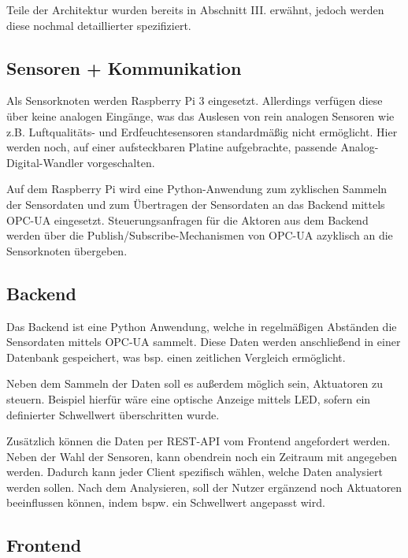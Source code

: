 \documentclass[letterpaper, 10 pt, conference]{ieeeconf}  %
\begin{document}
Teile der Architektur wurden bereits in Abschnitt III. erwähnt, jedoch werden diese nochmal detaillierter spezifiziert.

\subsection{Sensoren + Kommunikation}
Als Sensorknoten werden Raspberry Pi 3 eingesetzt. Allerdings verfügen diese über keine analogen Eingänge, was das Auslesen von rein analogen Sensoren wie z.B. Luftqualitäts- und Erdfeuchtesensoren standardmäßig nicht ermöglicht. Hier werden noch, auf einer aufsteckbaren Platine aufgebrachte, passende Analog-Digital-Wandler vorgeschalten.

Auf dem Raspberry Pi wird eine Python-Anwendung zum zyklischen Sammeln der Sensordaten und zum Übertragen der Sensordaten an das Backend mittels OPC-UA eingesetzt. Steuerungsanfragen für die Aktoren aus dem Backend werden über die Publish/Subscribe-Mechanismen von OPC-UA azyklisch an die Sensorknoten übergeben.

\subsection{Backend}

Das Backend ist eine Python Anwendung, welche in regelmäßigen Abständen die Sensordaten mittels OPC-UA sammelt.
Diese Daten werden anschließend in einer Datenbank gespeichert, was bsp. einen zeitlichen Vergleich ermöglicht.

Neben dem Sammeln der Daten soll es außerdem möglich sein, Aktuatoren zu steuern. 
Beispiel hierfür wäre eine optische Anzeige mittels LED, sofern ein definierter Schwellwert überschritten wurde.

Zusätzlich können die Daten per REST-API vom Frontend angefordert werden. 
Neben der Wahl der Sensoren, kann obendrein noch ein Zeitraum mit angegeben werden. 
Dadurch kann jeder Client spezifisch wählen, welche Daten analysiert werden sollen.
Nach dem Analysieren, soll der Nutzer ergänzend noch Aktuatoren beeinflussen können, indem bspw. ein Schwellwert angepasst wird. 

\subsection{Frontend}
\end{document}
